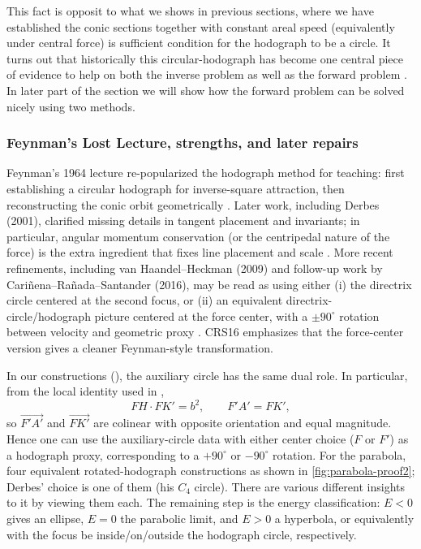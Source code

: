 This fact is opposit to what we shows in previous sections, where we have established the conic sections together with constant areal speed (equivalently under central force) is sufficient condition for the hodograph to be a circle. It turns out that historically this circular-hodograph has become one central piece of evidence to help on both the inverse problem as well as the forward problem \cite{maxwell1877mattermotion,derbes2001reinventing,goodstein1996feynman,carinena2016newlook}. In later part of the section we will show how the forward problem can be solved nicely using two methods.

\subsubsection{Feynman's Lost Lecture, strengths, and later repairs}

Feynman's 1964 lecture re-popularized the hodograph method for teaching: first establishing a circular hodograph for inverse-square attraction, then reconstructing the conic orbit geometrically \cite{goodstein1996feynman}. Later work, including Derbes (2001), clarified missing details in tangent placement and invariants; in particular, angular momentum conservation (or the centripedal nature of the force) is the extra ingredient that fixes line placement and scale \cite{derbes2001reinventing}. More recent refinements, including van Haandel--Heckman (2009) and follow-up work by Cari\~nena--Ra\~nada--Santander (2016), may be read as using either (i) the directrix circle centered at the second focus, or (ii) an equivalent directrix-circle/hodograph picture centered at the force center, with a $\pm 90^\circ$ rotation between velocity and geometric proxy \cite{vanhaandelheckman2009teaching,carinena2016newlook}. CRS16 emphasizes that the force-center version gives a cleaner Feynman-style transformation.

In our constructions (), the auxiliary circle has the same dual role. In particular, from the local identity used in ,
\[
  FH\cdot FK' = b^2,
  \qquad
  F'\!A' = FK',
\]
so $\overrightarrow{F'\!A'}$ and $\overrightarrow{FK'}$ are colinear with opposite orientation and equal magnitude. Hence one can use the auxiliary-circle data with either center choice ($F$ or $F'$) as a hodograph proxy, corresponding to a $+90^\circ$ or $-90^\circ$ rotation. For the parabola, four equivalent rotated-hodograph constructions as shown in \cref{fig:parabola-proof2}; Derbes' choice is one of them (his $C_4$ circle). There are various different insights to it by viewing them each. The remaining step is the energy classification: $E<0$ gives an ellipse, $E=0$ the parabolic limit, and $E>0$ a hyperbola, or equivalently with the focus be inside/on/outside the hodograph circle, respectively.

